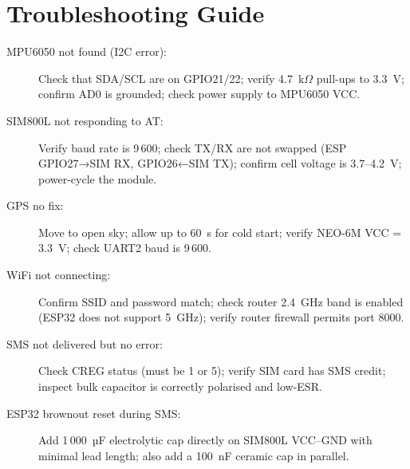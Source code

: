 \chapter{Troubleshooting Guide}
\label{app:troubleshoot}

\begin{description}
  \item[MPU6050 not found (I2C error):]
        Check that SDA/SCL are on GPIO21/22; verify 4.7~k$\Omega$ pull-ups to 3.3~V;
        confirm AD0 is grounded; check power supply to MPU6050 VCC.

  \item[SIM800L not responding to AT:]
        Verify baud rate is 9\,600; check TX/RX are not swapped (ESP GPIO27→SIM RX,
        GPIO26←SIM TX); confirm cell voltage is 3.7--4.2~V; power-cycle the module.

  \item[GPS no fix:]
        Move to open sky; allow up to 60~s for cold start; verify NEO-6M VCC = 3.3~V;
        check UART2 baud is 9\,600.

  \item[WiFi not connecting:]
        Confirm SSID and password match; check router 2.4~GHz band is enabled
        (ESP32 does not support 5~GHz); verify router firewall permits port 8000.

  \item[SMS not delivered but no error:]
        Check CREG status (must be 1 or 5); verify SIM card has SMS credit;
        inspect bulk capacitor is correctly polarised and low-ESR.

  \item[ESP32 brownout reset during SMS:]
        Add 1\,000~µF electrolytic cap directly on SIM800L VCC–GND with minimal
        lead length; also add a 100~nF ceramic cap in parallel.
\end{description}
